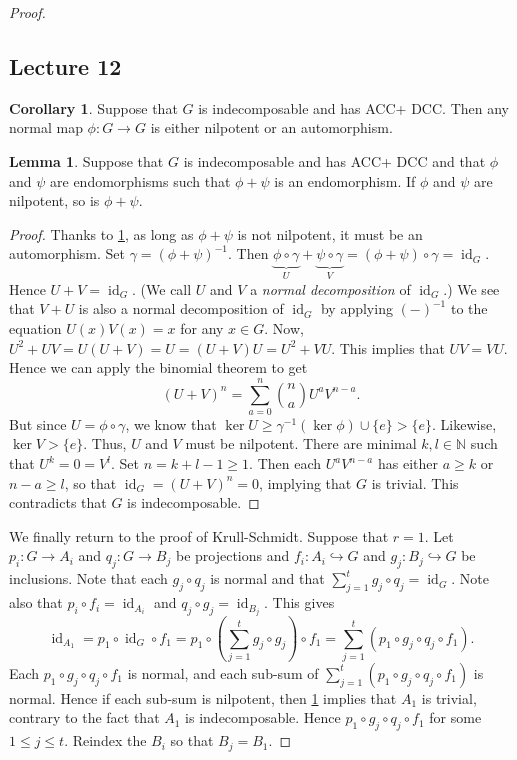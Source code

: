 \documentclass[10pt,letterpaper,cm]{nupset}
\theoremstyle{definition}
\theoremstyle{theorem}
\newtheorem{lemma}[definition]{Lemma}
\newtheorem{corollary}[definition]{Corollary}
\theoremstyle{remark}
\newcommand{\N}{\mathbb N}
\newcommand{\1}{\mathbf{1}}
\newcommand{\0}{\vec 0}
\newcommand{\dcc}{\textsf{DCC}\xspace}
\newcommand{\acc}{\textsf{ACC}\xspace}
\DeclareMathOperator{\id}{\mathrm{id}}
\begin{document}
\begin{proof}
\subsection{Lecture 12}

\begin{corollary}\label{pc1}
Suppose that $G$ is indecomposable and has \acc + \dcc. Then any normal map $\phi : G \to G$ is either nilpotent or an automorphism.
\end{corollary}

\begin{lemma}\label{PL1}
Suppose that $G$ is indecomposable and has \acc + \dcc and that $\phi$ and $\psi$ are endomorphisms such that $\phi + \psi$ is an endomorphism. If $\phi$ and $\psi$ are nilpotent, so is $\phi + \psi$.
\end{lemma}

\begin{proof}
Thanks to \cref{pc1}, as long as $\phi + \psi$ is not nilpotent, it must be an automorphism. Set $\gamma = (\phi + \psi)^{-1}$. Then $\underbrace{\phi \circ \gamma}_U + \underbrace{\psi \circ \gamma}_V = (\phi +\psi) \circ \gamma = \id_G$. Hence $U + V = \id_G$. (We call $U$ and $V$ a \textit{normal decomposition} of $\id_G$.) We see that $V + U$ is also a normal decomposition of $\id_G$ by applying $(-)^{-1}$ to the equation $U(x)V(x) =x$ for any $x \in G$.
Now, $U^2 + UV = U(U + V) = U = (U + V)U = U^2 + VU$. This implies that $UV = VU$. Hence we can apply the binomial theorem to get $$(U + V)^n = \sum_{a=0}^n{ {n}\choose {a}} U^aV^{n-a}.$$ But since $U = \phi \circ \gamma$, we know that $\ker{U}\geq \gamma^{-1}(\ker{\phi}) \cup \{e\} > \{e\}$. Likewise, $\ker{V} > \{e\}$. Thus, $U$ and $V$ must be nilpotent. There are minimal $k, l \in \N$ such that $U^k = 0 = V^l$. Set $n = k+l -1 \geq 1$. Then each $U^aV^{n-a}$ has either $a\geq k$ or $n-a\geq l$, so that $\id_G = (U+V)^n = 0$, implying that $G$ is trivial. This contradicts that $G$ is indecomposable.
\end{proof}

We finally return to the proof of Krull-Schmidt. Suppose that $r=1$. Let $p_i : G \to A_i$ and $q_j : G \to B_j$ be projections and $f_i : A_i \hookrightarrow G$ and $g_j : B_j \hookrightarrow G$ be inclusions. Note that each $g_j \circ q_j$ is normal and that $\sum_{j=1}^t g_j \circ q_j = \id_G$. Note also that $p_i \circ f_i = \id_{A_i}$ and $q_j \circ g_j = \id_{B_j}$. This gives $$\id_{A_1} = p_1 \circ \id_G \circ f_1 = p_1 \circ \left(\sum_{j=1}^t g_j \circ g_j\right) \circ f_1 = \sum_{j=1}^t (p_1 \circ g_j \circ q_j \circ f_1).$$ Each $p_1 \circ g_j \circ q_j \circ f_1$ is normal, and each sub-sum of $\sum_{j=1}^t (p_1 \circ g_j \circ q_j \circ f_1)$ is normal. Hence if each sub-sum is nilpotent, then \cref{PL1} implies that $A_1$ is trivial, contrary to the fact that $A_1$ is indecomposable. Hence $ p_1 \circ g_j \circ q_j \circ f_1$ for some $1\leq j \leq t$. Reindex the $B_i$ so that $B_j = B_1$. 


\end{proof}
\end{document}
